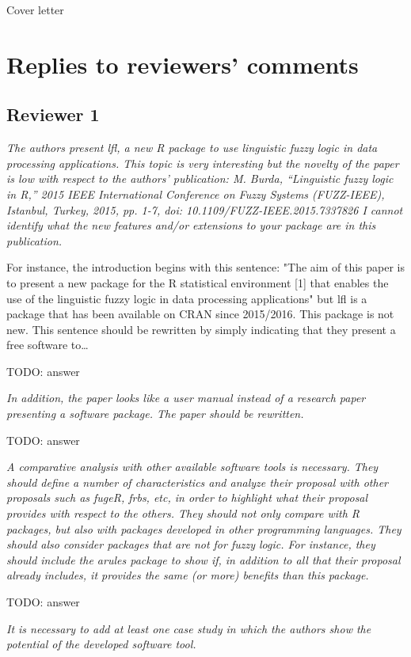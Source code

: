 \documentclass{article}
\newcommand{\todo}[1]{{\color{red} TODO: #1}}
\begin{document}
Cover letter


\section{Replies to reviewers' comments}

\subsection{Reviewer 1}

{\it The authors present lfl, a new R package to use linguistic fuzzy logic in data processing applications. This topic is very interesting but the novelty of the paper is low with respect to the authors' publication:
M. Burda, ``Linguistic fuzzy logic in R,'' 2015 IEEE International Conference on Fuzzy Systems (FUZZ-IEEE), Istanbul, Turkey, 2015, pp. 1-7, doi: 10.1109/FUZZ-IEEE.2015.7337826
I cannot identify what the new features and/or extensions to your package are in this publication.

For instance, the introduction begins with this sentence: "The aim of this paper is to present a new package for the R statistical environment [1] that enables the use of the linguistic fuzzy logic in data processing applications" but lfl is a package that has been available on CRAN since 2015/2016. This package is not new. This sentence should be rewritten by simply indicating that they present a free software to\ldots }

\todo{answer}

{\it In addition, the paper looks like a user manual instead of a research paper presenting a software package. The paper should be rewritten. }

\todo{answer}

{\it A comparative analysis with other available software tools is necessary. They should define a number of characteristics and analyze their proposal with other proposals such as fugeR, frbs, etc, in order to highlight what their proposal provides with respect to the others. They should not only compare with R packages, but also with packages developed in other programming languages. They should also consider packages that are not for fuzzy logic. For instance, they should include the arules package to show if, in addition to all that their proposal already includes, it provides the same (or more) benefits than this package. }

\todo{answer}

{\it It is necessary to add at least one case study in which the authors show the potential of the developed software tool. }
\end{document}
